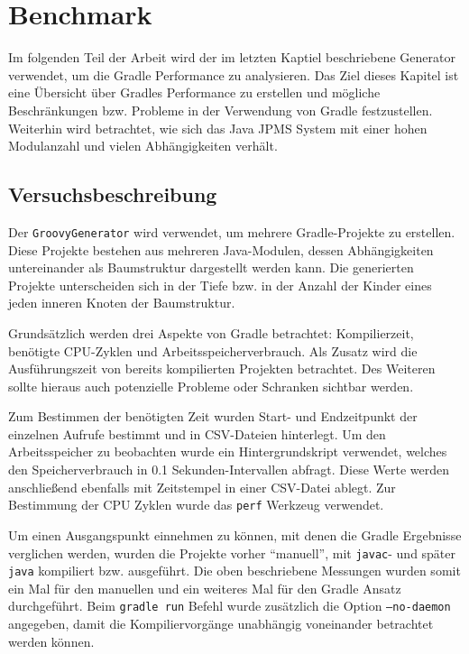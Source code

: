 
\section{Benchmark}
\label{ch-benchmark}

Im folgenden Teil der Arbeit wird der im letzten Kaptiel  beschriebene Generator verwendet, um die Gradle Performance zu analysieren.
Das Ziel dieses Kapitel ist eine Übersicht über Gradles Performance zu erstellen und mögliche Beschränkungen bzw. Probleme in der Verwendung von Gradle festzustellen.
Weiterhin wird betrachtet, wie sich das Java JPMS System mit einer hohen Modulanzahl und vielen Abhängigkeiten verhält.

\subsection{Versuchsbeschreibung}


Der \texttt{GroovyGenerator} wird verwendet, um mehrere Gradle-Projekte zu erstellen.
Diese Projekte bestehen aus mehreren Java-Modulen, dessen Abhängigkeiten untereinander als Baumstruktur dargestellt werden kann.
Die generierten Projekte unterscheiden sich in der Tiefe bzw. in der Anzahl der Kinder eines jeden inneren Knoten der Baumstruktur. 

Grundsätzlich werden drei Aspekte von Gradle betrachtet: Kompilierzeit, benötigte CPU-Zyklen und Arbeitsspeicherverbrauch.
Als Zusatz wird die Ausführungszeit von bereits kompilierten Projekten betrachtet.
Des Weiteren sollte hieraus auch potenzielle Probleme oder Schranken sichtbar werden.

Zum Bestimmen der benötigten Zeit wurden Start- und Endzeitpunkt der einzelnen Aufrufe bestimmt und in CSV-Dateien hinterlegt.
Um den Arbeitsspeicher zu beobachten wurde ein Hintergrundskript verwendet, welches den Speicherverbrauch in 0.1 Sekunden-Intervallen abfragt.
Diese Werte werden anschließend ebenfalls mit Zeitstempel in einer CSV-Datei ablegt.
Zur Bestimmung der CPU Zyklen wurde das \texttt{perf} Werkzeug verwendet.

Um einen Ausgangspunkt einnehmen zu können, mit denen die Gradle Ergebnisse verglichen werden, wurden die Projekte vorher \enquote{manuell}, mit \texttt{javac}- und später \texttt{java} kompiliert bzw. ausgeführt.
Die oben beschriebene Messungen wurden somit ein Mal für den manuellen und ein weiteres Mal für den Gradle Ansatz durchgeführt.
Beim \texttt{gradle run} Befehl wurde zusätzlich die Option \texttt{--no-daemon} angegeben, damit die Kompiliervorgänge unabhängig voneinander betrachtet werden können.

